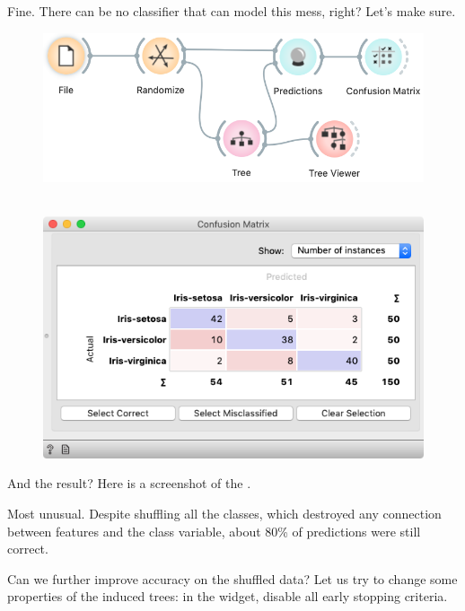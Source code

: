 Fine. There can be no classifier that can model this mess, right? Let’s make sure.

\begin{figure}[h]
    \includegraphics[scale=0.4]{graphics/ch-how_to_cheat/workflow_classification.png}
    \caption{$\;$} %
\end{figure}

\begin{figure}
    \includegraphics[scale=0.35]{graphics/ch-how_to_cheat/confusion_randomized.png}
\end{figure}

And the result? Here is a screenshot of the .

Most unusual. Despite shuffling all the classes, which destroyed any connection between features and the class variable, about 80\% of predictions were still correct.

\clearpage

Can we further improve accuracy on the shuffled data? Let us try to change some properties of the induced trees: in the  widget, disable all early stopping criteria.

